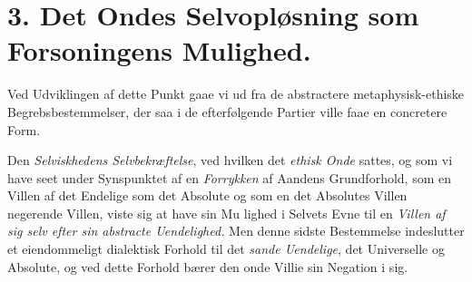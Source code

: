 \section*{3. Det Ondes Selvopløsning som Forsoningens Mulighed.}

Ved Udviklingen af dette Punkt gaae vi ud fra de abstractere metaphysisk-ethiske
Begrebsbestemmelser, der saa i de efterfølgende Partier ville faae en concretere
Form.

Den \emph{Selviskhedens Selvbekræftelse}, ved hvilken det \emph{ethisk Onde}
sattes, og som vi have seet under Synspunktet af en \emph{Forrykken} af Aandens
Grundforhold, som en Villen af det Endelige som det Absolute og som en det
Absolutes Villen negerende Villen, viste sig at have sin Mu\-%
\setcounter{footnote}{0}%
lighed i Selvets Evne til en \emph{Villen af sig selv efter sin abstracte
Uendelighed.} Men denne sidste Bestemmelse indeslutter et eiendommeligt
dialektisk Forhold til det \emph{sande Uendelige}, det Universelle og Absolute,
og ved dette Forhold bærer den onde Villie sin Negation i sig.

